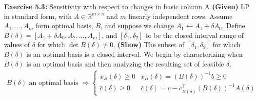 \documentclass[11pt]{exam}
\begin{document}
\begin{questions}







    \question \textbf{Exercise 5.3:} Sensitivity with respect to changes in basic column A
    \newline\textbf{(Given)} LP in standard form, with $A\in \mathbb R^{m\times n}$ and $m$ linearly independent rows. Assume $A_1, \dots, A_m$ form optimal basis, $B$, and suppose we change $A_1 \leftarrow A_1 + \delta A_0$. Define $B(\delta) = [A_1 + \delta A_0, A_2, \dots, A_m]$, and $[\delta_1, \delta_2]$ to be the closed interval range of values of $\delta$ for which $\det B(\delta) \neq 0$.
    \newline\textbf{(Show)} The subset of $[\delta_1, \delta_2]$ for which $B(\delta)$ is an optimal basis is a closed interval. 
    \newline\newline We begin by characterizing when $B(\delta)$ is an optimal basis and then analyzing the resulting set of feasible $\delta$.  
    \begin{align*}
      B(\delta) \text{ an optimal basis } \Longrightarrow \begin{cases}
        x_B(\delta) \geq 0 & x_B(\delta) = (B(\delta))^{-1}b \geq 0\\
        \bar c(\delta) \geq 0 &\bar c(\delta) = c - c_{B(\delta)}^\top (B(\delta))^{-1}A(\delta)
      \end{cases}
    \end{align*}

\end{questions}
\end{document}
